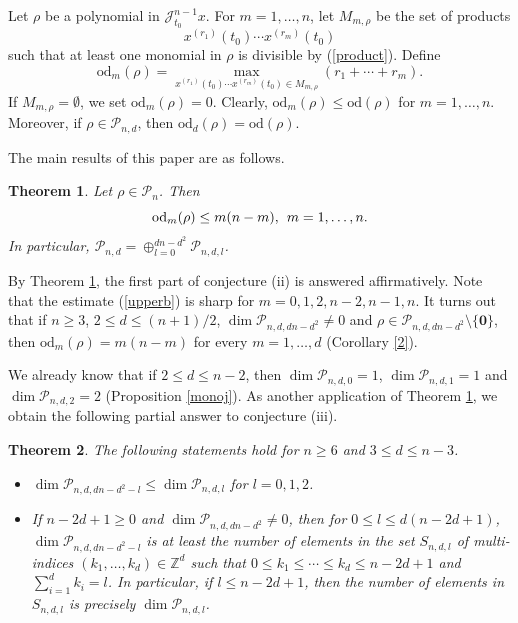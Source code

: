 \documentclass[11pt]{amsart}
\numberwithin{equation}{section}
\newcommand{\di}{\displaystyle}
\newtheorem{thm}{Theorem}[section]
\newcommand{\bz}{\mathbb{Z}}
\newcommand{\sd}{\mathrm{od}}
\newcommand{\scp}{\mathscr{P}}
\newcommand{\sjmx}{\mathscr{J}^{n-1}_{t_0} x}
\newcommand{\pn}{\mathscr{P}_{n}}
\newcommand{\pnd}{\mathscr{P}_{n, d}}
\newcommand{\pndl}{\mathscr{P}_{n, d, l}}
\newcommand{\zero}{\mathbf{0}}
\begin{document}
Let $\rho$ be a polynomial in $\sjmx$. For $m=1,\dots,n$, let $M_{m,\rho}$ be the set of products
\begin{equation}\label{product}
    x^{(r_1)}(t_0)\cdots x^{(r_m)}(t_0)
\end{equation}
such that at least one monomial in $\rho$ is divisible by (\ref{product}).
Define
\begin{equation} \label{odm}
\sd_{m}(\rho)=\max_{x^{(r_1)}(t_0) \cdots x^{(r_m)}(t_0) \in M_{m, \rho}}(r_1+\cdots+r_m).
\end{equation}
If $M_{m, \rho}=\emptyset$, we set $\sd_{m}(\rho)=0$. Clearly, $\sd_m(\rho) \le \sd(\rho)$ for $m=1,\dots,n$. Moreover, if $\rho \in \pnd$, then $\sd_d(\rho)=\sd(\rho)$.

The main results of this paper are as follows.
\begin{thm} \label{arb}
Let $\rho \in \pn$. Then
\begin{equation} \label{upperb}
\sd_m(\rho) \le m(n-m), \hspace{1.5mm} m=1,\dots,n.
\end{equation}
In particular, $\di \pnd=\oplus_{l=0}^{dn-d^2} \scp_{n, d, l}$.
\end{thm}

By Theorem \ref{arb}, the first part of conjecture (ii) is answered affirmatively.
Note that the estimate (\ref{upperb}) is sharp for $m=0,1,2,n-2,n-1,n$.
It turns out that if $n \ge 3$, $2 \le d \le (n+1)/2$, $\dim \scp_{n, d, dn-d^2} \neq 0$ and $\rho \in \scp_{n, d, dn-d^2} \setminus \{\zero\}$, then $\sd_m(\rho)=m(n-m)$ for every $m=1,\dots,d$ (Corollary \ref{2}).

We already know that if $2 \le d \le n-2$, then $\dim \scp_{n, d, 0} =1$, $\dim \scp_{n, d, 1} =1$ and $\dim \scp_{n, d, 2} =2$ (Proposition \ref{monoj}).
As another application of Theorem \ref{arb}, we obtain the following partial answer to conjecture (iii).

\begin{thm} \label{bounds}
The following statements hold for $n \ge 6$ and $3 \le d \le n-3$.
\begin{itemize}
  \item[(a)] $\dim \scp_{n, d, dn-d^2-l} \le \dim \scp_{n, d, l}$ for $l=0,1,2$.

  \item[(b)] If $n-2d+1 \ge 0$ and $\dim \scp_{n, d, dn-d^2} \neq 0$, then for $0 \le l \le d(n-2d+1)$,
  $\dim \scp_{n, d, dn-d^2-l}$ is at least the number of elements in the set
  $S_{n, d, l}$ of multi-indices
  $(k_1,\dots,k_d) \in \bz^d$ such that $0 \le k_1 \le \cdots \le k_d \le n-2d+1$ and $\sum_{i=1}^d k_i=l$.
  In particular, if $l \le n-2d+1$, then the number of elements in $S_{n, d, l}$ is precisely $\dim \pndl$.
\end{itemize}
\end{thm}
\end{document}
